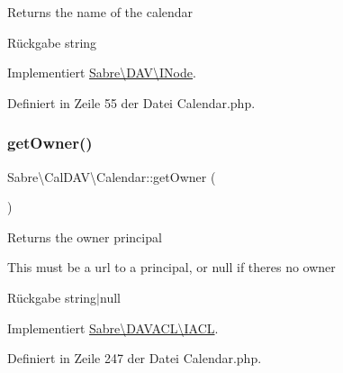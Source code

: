 Returns the name of the calendar

\begin{DoxyReturn}{Rückgabe}
string 
\end{DoxyReturn}


Implementiert \mbox{\hyperlink{interface_sabre_1_1_d_a_v_1_1_i_node_ab616fe836b1ae36af12126a2bc934dce}{Sabre\textbackslash{}\+D\+A\+V\textbackslash{}\+I\+Node}}.



Definiert in Zeile 55 der Datei Calendar.\+php.

\mbox{\label{class_sabre_1_1_cal_d_a_v_1_1_calendar_aa3425682a478cc4c10f8828290e55665}} 
\subsubsection{\texorpdfstring{get\+Owner()}{getOwner()}}
{\footnotesize\ttfamily Sabre\textbackslash{}\+Cal\+D\+A\+V\textbackslash{}\+Calendar\+::get\+Owner (\begin{DoxyParamCaption}{ }\end{DoxyParamCaption})}

Returns the owner principal

This must be a url to a principal, or null if there\textquotesingle{}s no owner

\begin{DoxyReturn}{Rückgabe}
string$\vert$null 
\end{DoxyReturn}


Implementiert \mbox{\hyperlink{interface_sabre_1_1_d_a_v_a_c_l_1_1_i_a_c_l_a05f531b4ae1a86eab4e6e95b0413390e}{Sabre\textbackslash{}\+D\+A\+V\+A\+C\+L\textbackslash{}\+I\+A\+CL}}.



Definiert in Zeile 247 der Datei Calendar.\+php.

\mbox{\label{class_sabre_1_1_cal_d_a_v_1_1_calendar_a44acbaebc3c3374606e67011a09c6685}} 
